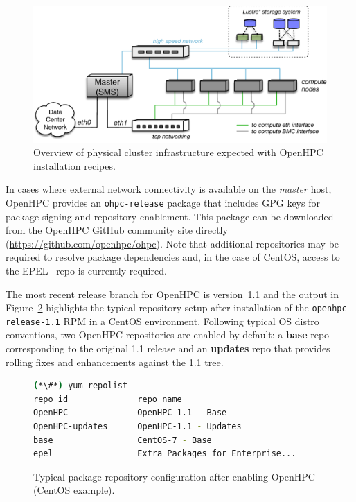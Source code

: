 \documentclass{sig-alternate-05-2015}
\begin{document}
\begin{figure}[h]
  \includegraphics[width=0.95\linewidth]{figures/ohpc-arch-small.pdf}
  \caption{Overview of physical cluster infrastructure expected with OpenHPC
    installation recipes.}
  \label{fig:cluster_arch}
\end{figure}

 In cases where external network connectivity is
available on the {\em master} host, OpenHPC provides an \texttt{ohpc-release}
package that includes GPG keys for package signing and repository enablement.
This package can be downloaded from the OpenHPC GitHub community site directly
(\url{https://github.com/openhpc/ohpc}). Note that additional repositories may
be required to resolve package dependencies and, in the case of CentOS, access
to the EPEL~\cite{epel_url} repo is currently required.

The most recent release branch for OpenHPC is version~1.1 and the output in
Figure~\ref{fig:repolist} highlights the typical repository setup after
installation of the \texttt{openhpc-release-1.1} RPM in a CentOS
environment. Following typical OS distro conventions, two OpenHPC
repositories are enabled by default: a { \bf base} repo corresponding to the
original 1.1 release and an {\bf updates} repo that provides rolling fixes and
enhancements against the 1.1 tree.

\begin{figure}[h]
\begin{lstlisting}[language=bash,keywords={}]
(*\#*) yum repolist
repo id              repo name
OpenHPC              OpenHPC-1.1 - Base
OpenHPC-updates      OpenHPC-1.1 - Updates
base                 CentOS-7 - Base
epel                 Extra Packages for Enterprise...
\end{lstlisting}
\vspace*{-0.3cm}
  \caption{Typical package repository configuration after enabling OpenHPC
    (CentOS example).}
    \label{fig:repolist}
\end{figure}
\end{document}
